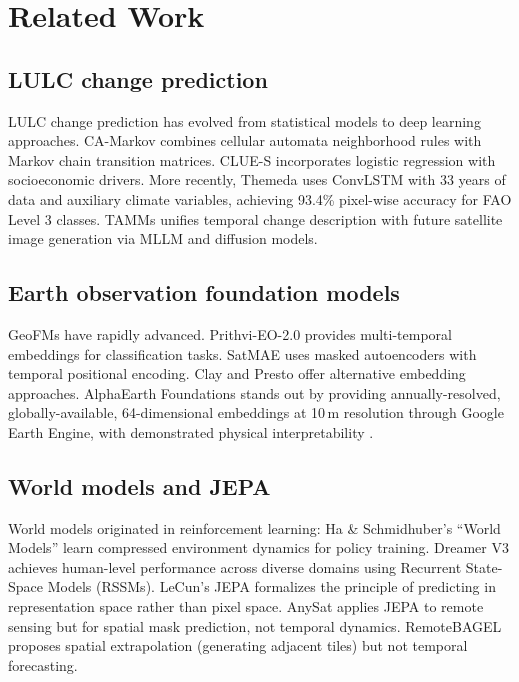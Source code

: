 \documentclass{article}
\begin{document}
\section{Related Work}
\label{sec:related}

\subsection{LULC change prediction}

LULC change prediction has evolved from statistical models to deep learning approaches. CA-Markov \citep{veldkamp2004clues} combines cellular automata neighborhood rules with Markov chain transition matrices. CLUE-S \citep{verburg2002clues} incorporates logistic regression with socioeconomic drivers. More recently, Themeda \citep{turnbull2025themeda} uses ConvLSTM with 33 years of data and auxiliary climate variables, achieving 93.4\% pixel-wise accuracy for FAO Level 3 classes. TAMMs \citep{guo2025tamms} unifies temporal change description with future satellite image generation via MLLM and diffusion models.

\subsection{Earth observation foundation models}

GeoFMs have rapidly advanced. Prithvi-EO-2.0 \citep{jakubik2024prithvi} provides multi-temporal embeddings for classification tasks. SatMAE \citep{cong2022satmae} uses masked autoencoders with temporal positional encoding. Clay and Presto offer alternative embedding approaches. AlphaEarth Foundations \citep{brown2025alphaearth} stands out by providing annually-resolved, globally-available, 64-dimensional embeddings at 10\,m resolution through Google Earth Engine, with demonstrated physical interpretability \citep{rahman2026interpretable, benavides2026whatonearth}.

\subsection{World models and JEPA}

World models originated in reinforcement learning: Ha \& Schmidhuber's ``World Models'' \citep{ha2018world} learn compressed environment dynamics for policy training. Dreamer V3 \citep{hafner2023dreamerv3} achieves human-level performance across diverse domains using Recurrent State-Space Models (RSSMs). LeCun's JEPA \citep{lecun2022jepa} formalizes the principle of predicting in representation space rather than pixel space. AnySat \citep{astruc2024anysat} applies JEPA to remote sensing but for spatial mask prediction, not temporal dynamics. RemoteBAGEL \citep{remotebagel2025} proposes spatial extrapolation (generating adjacent tiles) but not temporal forecasting.
\end{document}
